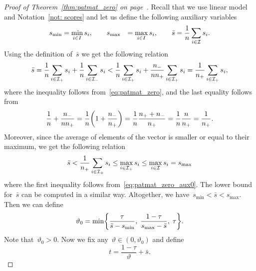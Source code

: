 \patmatzero*
\begin{proof}[Proof of Theorem~\ref{thm:patmat_zero} on page~\pageref{thm:patmat_zero}]
  Recall that we use linear model and Notation~\ref{not: scores} and let us define the following auxiliary variables
  \begin{equation*}
    \begin{aligned}
      s_{\min} & = \min_{i \in I} s_i, \qquad
      s_{\max} & = \max_{i \in I} s_i, \qquad
      \bar{s} & = \frac{1}{n} \sum_{i \in \mathcal{I}} s_i. \\
    \end{aligned}
  \end{equation*}
  Using the definition of~$\bar{s}$ we get the following relation
  \begin{equation}\label{eq:patmat_zero_aux0}
    \bar{s}
      = \frac{1}{n}\sum_{i \in \mathcal{I}_{+}} s_i + \frac{1}{n} \sum_{i \in \mathcal{I}_{-}} s_i
      < \frac{1}{n} \sum_{i \in \mathcal{I}_{+}} s_i + \frac{n_{-}}{nn_{+}} \sum_{i \in \mathcal{I}_{+}} s_i
      = \frac{1}{n_{+}} \sum_{i \in \mathcal{I}_{+}} s_i,
  \end{equation}
  where the inequality follows from~\eqref{eq:patmat_zero}, and the last equality follows from
  \begin{equation*}
    \frac{1}{n} + \frac{\nneg}{n\npos}
      = \frac{1}{n} \Brac{1 + \frac{\nneg}{\npos}} 
      = \frac{1}{n} \frac{\npos + \nneg}{\npos}
      = \frac{1}{n} \frac{n}{\npos}
      = \frac{1}{\npos}.
  \end{equation*}
  Moreover, since the average of elements of the vector is smaller or equal to their maximum, we get the following relation
  \begin{equation*}
    \bar{s}
      < \frac{1}{n_{+}} \sum_{i \in \mathcal{I}_{+}} s_i
      \leq \max_{i \in \mathcal{I}_{+}} s_i
      \leq \max_{i \in \mathcal{I}} s_i
      = s_{\max}
  \end{equation*}
  where the first inequality follows from~\eqref{eq:patmat_zero_aux0}. The lower bound for~$\bar{s}$ can be computed in a similar way. Altogether, we have~$s_{\min} < \bar{s} < s_{\max}$. Then we can define
  \begin{equation*}
    \vartheta_0 = \min\Brac[c]{\frac{\tau}{\bar{s} - s_{\min}}, \; \frac{1-\tau}{s_{\max}-\bar{s}}, \; \tau}.
  \end{equation*}
  Note that~$\vartheta_0 > 0.$ Now we fix any~$\vartheta \in (0, \vartheta_0)$ and define
  \begin{equation*}
    t = \frac{1 - \tau}{\vartheta} + \bar{s}.
  \end{equation*}

\end{proof}
